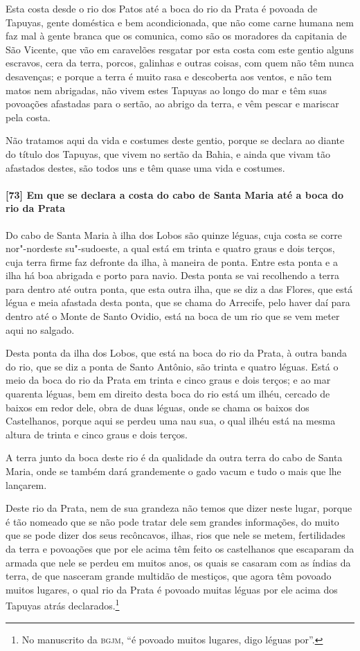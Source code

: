\begin{linenumbers}
Esta costa desde o rio dos Patos até a boca do rio da Prata é povoada de Tapuyas, gente
doméstica e bem acondicionada, que não come carne humana nem faz mal à gente branca que os
comunica, como são os moradores da capitania de São Vicente, que vão em caravelões
resgatar por esta costa com este gentio alguns escravos, cera da terra, porcos, galinhas e
outras coisas, com quem não têm nunca desavenças; e porque a terra é muito rasa e
descoberta aos ventos, e não tem matos nem abrigadas, não vivem estes Tapuyas ao longo do
mar e têm suas povoações afastadas para o sertão, ao abrigo da terra, e vêm pescar e
mariscar pela costa.

Não tratamos aqui da vida e costumes deste gentio, porque se declara ao diante do título
dos Tapuyas, que vivem no sertão da Bahia, e ainda que vivam tão afastados destes, são
todos uns e têm quase uma vida e costumes.

\paragraph{[73] Em que se declara a costa do cabo de Santa Maria até a boca do rio da Prata} \quad
Do cabo de Santa Maria à ilha dos Lobos são quinze léguas, cuja costa se corre
nor"-nordeste su"-sudoeste, a qual está em trinta e quatro graus e dois terços, cuja terra
firme faz defronte da ilha, à maneira de ponta. Entre esta ponta e a ilha há boa abrigada
e porto para navio. Desta ponta se vai recolhendo a terra para dentro até outra ponta, que
esta outra ilha, que se diz a das Flores, que está légua e meia afastada desta ponta, que
se chama do Arrecife, pelo haver daí para dentro até o Monte de Santo Ovidio, está na boca
de um rio que se vem meter aqui no salgado.

Desta ponta da ilha dos Lobos, que está na boca do rio da Prata, à outra banda do rio, que
se diz a ponta de Santo Antônio, são trinta e quatro léguas. Está o meio da boca do rio da
Prata em trinta e cinco graus e dois terços; e ao mar quarenta léguas, bem em direito
desta boca do rio está um ilhéu, cercado de baixos em redor dele, obra de duas léguas,
onde se chama os baixos dos Castelhanos, porque aqui se perdeu uma nau sua, o qual ilhéu
está na mesma altura de trinta e cinco graus e dois terços.

A terra junto da boca deste rio é da qualidade da outra terra do cabo de Santa Maria, onde
se também dará grandemente o gado vacum e tudo o mais que lhe lançarem.

Deste rio da Prata, nem de sua grandeza não temos que dizer neste lugar, porque é tão
nomeado que se não pode tratar dele sem grandes informações, do muito que se pode dizer
dos seus recôncavos, ilhas, rios que nele se metem, fertilidades da terra e povoações que
por ele acima têm feito os castelhanos que escaparam da armada que nele se perdeu em
muitos anos, os quais se casaram com as índias da terra, de que nasceram grande multidão
de mestiços, que agora têm povoado muitos lugares, o qual rio da Prata é povoado muitas
léguas por ele acima dos Tapuyas atrás declarados.\footnote{ No manuscrito da
\textsc{bgjm}, ``é povoado muitos lugares, digo léguas por''.}


\end{linenumbers}
